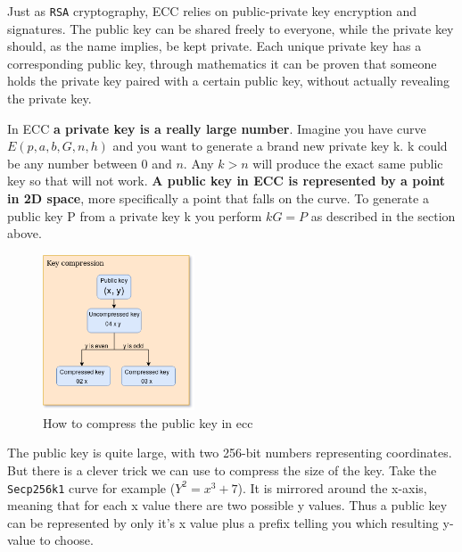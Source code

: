 Just as \texttt{RSA} cryptography, ECC relies on public-private key encryption and signatures. 
The public key can be shared freely to everyone, while the private key should, as the name implies, 
be kept private. Each unique private key has a corresponding public key, through mathematics it 
can be proven that someone holds the private key paired with a certain public key, without actually 
revealing the private key.\cite{antonopoulos_2017}\cite{Secp256k1_def}

In ECC \textbf{a private key is a really large number}. Imagine you have curve $E(p,a,b,G,n,h)$ 
and you want to generate a brand new private key k. k could be any number between 0 and $n$. Any 
$k > n$ will produce the exact same public key so that will not work. \textbf{A public key in ECC is 
represented by a point in 2D space}, more specifically a point that falls on the curve.\cite{antonopoulos_2017} To generate a 
public key P from a private key k you perform $kG = P$ as described in the section above.\cite{ecc_def}\cite{Secp256k1_def}

\begin{figure}
	\begin{center}
		\includegraphics[width=0.4\textwidth]{background/images/key_compression.png}
	\end{center}
	\vspace{-8mm}
	\caption{How to compress the public key in ecc}
\end{figure}

The public key is quite large, with two 256-bit numbers representing coordinates. But there is a 
clever trick we can use to compress the size of the key. Take the \texttt{Secp256k1} curve for 
example ($Y^2=x^3+7$). It is mirrored around the x-axis, meaning that for each x value there 
are two possible y values. Thus a public key can be represented by only it's x value plus a 
prefix telling you which resulting y-value to choose.\cite{antonopoulos_2017}

